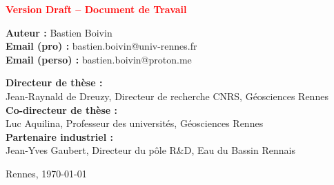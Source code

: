 \begin{titlepage}
\begin{center}
      {\Large\textcolor{red}{\textbf{Version Draft – Document de Travail}}}
      \vspace{2cm}
  
      {\large
        \textbf{Auteur :} Bastien Boivin\\[0.3cm]
        \textbf{Email (pro) :} bastien.boivin@univ-rennes.fr\\
        \textbf{Email (perso) :} bastien.boivin@proton.me\\[1cm]
      }
  
      \noindent
      \begin{flushleft}
        \textbf{Directeur de thèse :}\\
        Jean-Raynald de Dreuzy, Directeur de recherche CNRS, Géosciences Rennes\\[0.5cm]
        \textbf{Co-directeur de thèse :}\\
        Luc Aquilina, Professeur des universités, Géosciences Rennes\\[0.5cm]
        \textbf{Partenaire industriel :}\\
        Jean-Yves Gaubert, Directeur du pôle R\&D, Eau du Bassin Rennais\\
      \end{flushleft}
  
      \vfill
      Rennes, \today
    \end{center}
  \end{titlepage}